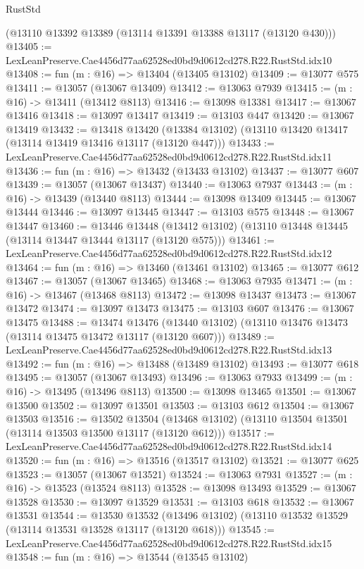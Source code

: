 \begin{lexlean}{RustStd}
\begin{coremodule}
    (@13110 @13392 @13389 (@13114 @13391 @13388 @13117 (@13120 @430)))
@13405 := LexLeanPreserve.Cae4456d77aa62528ed0bd9d0612cd278.R22.RustStd.idx10
@13408 := fun (m : @16) => @13404 (@13405 @13102)
@13409 := @13077 @575
@13411 := @13057 (@13067 @13409)
@13412 := @13063 @7939
@13415 := (m : @16) -> @13411 (@13412 @8113)
@13416 := @13098 @13381
@13417 := @13067 @13416
@13418 := @13097 @13417
@13419 := @13103 @447
@13420 := @13067 @13419
@13432 := @13418
    @13420
    (@13384 @13102)
    (@13110 @13420 @13417 (@13114 @13419 @13416 @13117 (@13120 @447)))
@13433 := LexLeanPreserve.Cae4456d77aa62528ed0bd9d0612cd278.R22.RustStd.idx11
@13436 := fun (m : @16) => @13432 (@13433 @13102)
@13437 := @13077 @607
@13439 := @13057 (@13067 @13437)
@13440 := @13063 @7937
@13443 := (m : @16) -> @13439 (@13440 @8113)
@13444 := @13098 @13409
@13445 := @13067 @13444
@13446 := @13097 @13445
@13447 := @13103 @575
@13448 := @13067 @13447
@13460 := @13446
    @13448
    (@13412 @13102)
    (@13110 @13448 @13445 (@13114 @13447 @13444 @13117 (@13120 @575)))
@13461 := LexLeanPreserve.Cae4456d77aa62528ed0bd9d0612cd278.R22.RustStd.idx12
@13464 := fun (m : @16) => @13460 (@13461 @13102)
@13465 := @13077 @612
@13467 := @13057 (@13067 @13465)
@13468 := @13063 @7935
@13471 := (m : @16) -> @13467 (@13468 @8113)
@13472 := @13098 @13437
@13473 := @13067 @13472
@13474 := @13097 @13473
@13475 := @13103 @607
@13476 := @13067 @13475
@13488 := @13474
    @13476
    (@13440 @13102)
    (@13110 @13476 @13473 (@13114 @13475 @13472 @13117 (@13120 @607)))
@13489 := LexLeanPreserve.Cae4456d77aa62528ed0bd9d0612cd278.R22.RustStd.idx13
@13492 := fun (m : @16) => @13488 (@13489 @13102)
@13493 := @13077 @618
@13495 := @13057 (@13067 @13493)
@13496 := @13063 @7933
@13499 := (m : @16) -> @13495 (@13496 @8113)
@13500 := @13098 @13465
@13501 := @13067 @13500
@13502 := @13097 @13501
@13503 := @13103 @612
@13504 := @13067 @13503
@13516 := @13502
    @13504
    (@13468 @13102)
    (@13110 @13504 @13501 (@13114 @13503 @13500 @13117 (@13120 @612)))
@13517 := LexLeanPreserve.Cae4456d77aa62528ed0bd9d0612cd278.R22.RustStd.idx14
@13520 := fun (m : @16) => @13516 (@13517 @13102)
@13521 := @13077 @625
@13523 := @13057 (@13067 @13521)
@13524 := @13063 @7931
@13527 := (m : @16) -> @13523 (@13524 @8113)
@13528 := @13098 @13493
@13529 := @13067 @13528
@13530 := @13097 @13529
@13531 := @13103 @618
@13532 := @13067 @13531
@13544 := @13530
    @13532
    (@13496 @13102)
    (@13110 @13532 @13529 (@13114 @13531 @13528 @13117 (@13120 @618)))
@13545 := LexLeanPreserve.Cae4456d77aa62528ed0bd9d0612cd278.R22.RustStd.idx15
@13548 := fun (m : @16) => @13544 (@13545 @13102)

\end{coremodule}
\end{lexlean}
